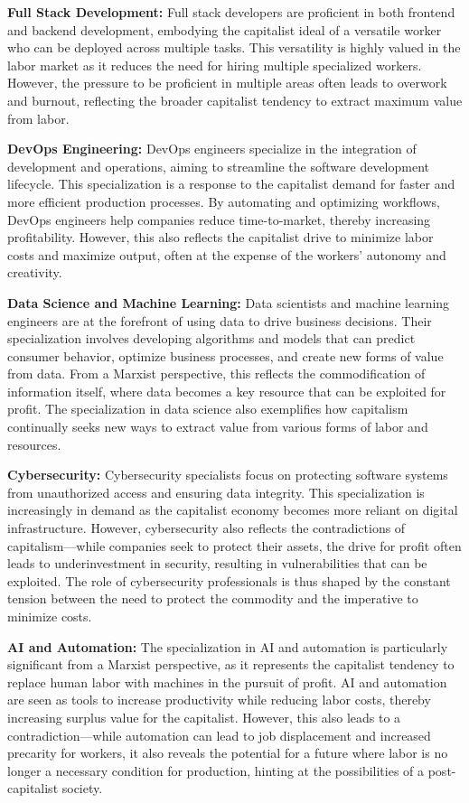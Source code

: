 \begin{refsection}
\begin{multicols}{2}
{\textbf{Full Stack Development:} Full stack developers are proficient in both frontend and backend development, embodying the capitalist ideal of a versatile worker who can be deployed across multiple tasks. This versatility is highly valued in the labor market as it reduces the need for hiring multiple specialized workers. However, the pressure to be proficient in multiple areas often leads to overwork and burnout, reflecting the broader capitalist tendency to extract maximum value from labor.

\textbf{DevOps Engineering:} DevOps engineers specialize in the integration of development and operations, aiming to streamline the software development lifecycle. This specialization is a response to the capitalist demand for faster and more efficient production processes. By automating and optimizing workflows, DevOps engineers help companies reduce time-to-market, thereby increasing profitability. However, this also reflects the capitalist drive to minimize labor costs and maximize output, often at the expense of the workers' autonomy and creativity.

\textbf{Data Science and Machine Learning:} Data scientists and machine learning engineers are at the forefront of using data to drive business decisions. Their specialization involves developing algorithms and models that can predict consumer behavior, optimize business processes, and create new forms of value from data. From a Marxist perspective, this reflects the commodification of information itself, where data becomes a key resource that can be exploited for profit. The specialization in data science also exemplifies how capitalism continually seeks new ways to extract value from various forms of labor and resources.

\textbf{Cybersecurity:} Cybersecurity specialists focus on protecting software systems from unauthorized access and ensuring data integrity. This specialization is increasingly in demand as the capitalist economy becomes more reliant on digital infrastructure. However, cybersecurity also reflects the contradictions of capitalism—while companies seek to protect their assets, the drive for profit often leads to underinvestment in security, resulting in vulnerabilities that can be exploited. The role of cybersecurity professionals is thus shaped by the constant tension between the need to protect the commodity and the imperative to minimize costs.

\textbf{AI and Automation:} The specialization in AI and automation is particularly significant from a Marxist perspective, as it represents the capitalist tendency to replace human labor with machines in the pursuit of profit. AI and automation are seen as tools to increase productivity while reducing labor costs, thereby increasing surplus value for the capitalist. However, this also leads to a contradiction—while automation can lead to job displacement and increased precarity for workers, it also reveals the potential for a future where labor is no longer a necessary condition for production, hinting at the possibilities of a post-capitalist society.

}
\end{multicols}
\end{refsection}
